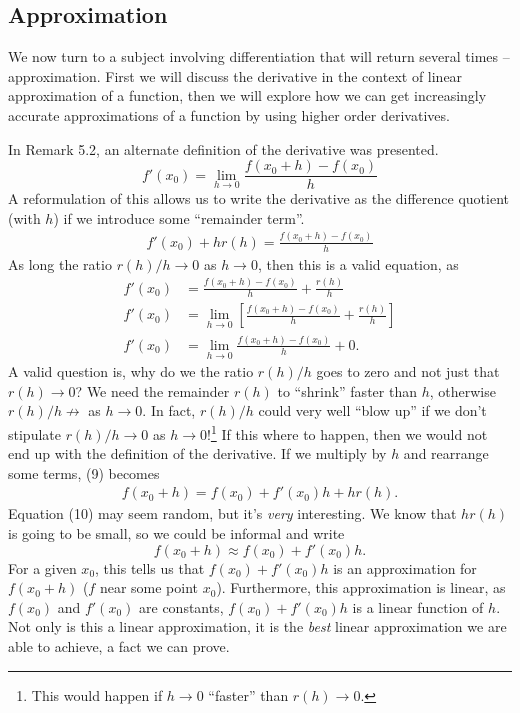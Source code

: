 \documentclass{article}
\theoremstyle{definition}
\begin{document}
\subsection{Approximation}
We now turn to a subject involving differentiation that will return several times -- approximation. First we will discuss the derivative in the context of linear approximation of a function, then we will explore how we can get increasingly accurate approximations of a function by using higher order derivatives.

In Remark 5.2, an alternate definition of the derivative was presented. $$f'(x_0)=\lim\limits_{h\to 0}\frac{f(x_0+h)-f(x_0)}{h}$$ A reformulation of this allows us to write the derivative as the difference quotient (with $ h $) if we introduce some ``remainder term''. 
\begin{align}
f'(x_0)+hr(h)=\frac{f(x_0+h)-f(x_0)}{h}
\end{align}
As long the ratio $ r(h)/h\to 0 $ as $ h\to 0 $, then this is a valid equation, as \begin{align*}
	f'(x_0)&=\frac{f(x_0+h)-f(x_0)}{h}+\frac{r(h)}{h}\\
	f'(x_0)&= \lim\limits_{h\to 0}\left[\frac{f(x_0+h)-f(x_0)}{h} + \frac{r(h)}{h}\right]\\
	f'(x_0)&= \lim\limits_{h\to 0}\frac{f(x_0+h)-f(x_0)}{h}+0.
\end{align*}
A valid question is, why do we the ratio $ r(h)/h $ goes to zero and not just that $ r(h)\to 0 $? We need the remainder $ r(h) $ to ``shrink'' faster than $ h $, otherwise $ r(h)/h\not\to $ as $ h\to 0 $. In fact, $ r(h)/h $ could very well ``blow up'' if we don't stipulate $ r(h)/h\to 0 $ as $ h\to 0 $!\footnote{This would happen if $ h\to 0 $ ``faster'' than $ r(h)\to 0 $.} If this where to happen, then we would not end up with the definition of the derivative. If we multiply by $ h $ and rearrange some terms, (9) becomes 
\begin{align}
	f(x_0+h)=f(x_0)+f'(x_0)h+hr(h).
\end{align}
Equation (10) may seem random, but it's \textit{very} interesting. We know that $ hr(h) $ is going to be small, so we could be informal and write $$ f(x_0+h)\approx f(x_0)+f'(x_0)h. $$ For a given $ x_0 $, this tells us that $ f(x_0)+f'(x_0)h $ is an approximation for $ f(x_0+h) $ ($ f $ near some point $ x_0 $). Furthermore, this approximation is linear, as $ f(x_0) $ and $ f'(x_0) $ are constants, $ f(x_0)+f'(x_0)h $ is a linear function of $ h $. Not only is this a linear approximation, it is the \textit{best} linear approximation we are able to achieve, a fact we can prove.
\end{document}
